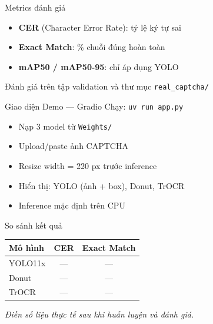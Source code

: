 \documentclass[aspectratio=169,12pt]{beamer}
\begin{document}
\begin{frame}{Metrics đánh giá}
  \begin{itemize}
    \item \textbf{CER} (Character Error Rate): tỷ lệ ký tự sai
    \item \textbf{Exact Match}: \% chuỗi đúng hoàn toàn
    \item \textbf{mAP50 / mAP50-95}: chỉ áp dụng YOLO
  \end{itemize}

  \vspace{0.4cm}
  Đánh giá trên tập validation và thư mục \texttt{real\_captcha/}
\end{frame}

\begin{frame}{Giao diện Demo --- Gradio}
  Chạy: \texttt{uv run app.py}

  \vspace{0.2cm}
  \begin{itemize}
    \item Nạp 3 model từ \texttt{Weights/}
    \item Upload/paste ảnh CAPTCHA
    \item Resize width = 220 px trước inference
    \item Hiển thị: YOLO (ảnh + box), Donut, TrOCR
    \item Inference mặc định trên CPU
  \end{itemize}
\end{frame}

\begin{frame}{So sánh kết quả}
  \begin{table}
    \centering
    \begin{tabular}{lcc}
      \toprule
      \textbf{Mô hình} & \textbf{CER} & \textbf{Exact Match} \\
      \midrule
      YOLO11x  & --- & --- \\
      Donut    & --- & --- \\
      TrOCR    & --- & --- \\
      \bottomrule
    \end{tabular}
  \end{table}

  \vspace{0.4cm}
  \small\textit{Điền số liệu thực tế sau khi huấn luyện và đánh giá.}
\end{frame}

\end{document}
